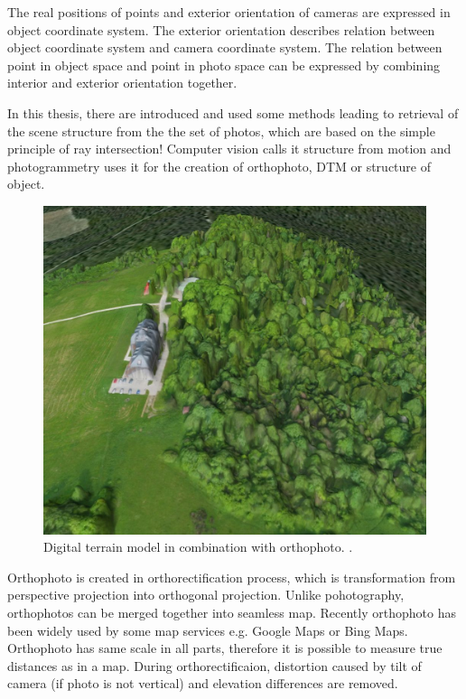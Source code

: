 \documentclass[a4paper,12pt]{article}
\begin{document}
The real positions of points and exterior orientation of cameras are expressed in object coordinate system. 
The exterior orientation describes relation between object coordinate system and camera coordinate system. 
The relation between point in object 
space and point in photo space can be expressed by combining interior and exterior orientation together.

In this thesis, there are introduced and used  some methods leading to retrieval of the scene structure from the 
the set of photos, which are based on the simple principle of ray intersection! Computer vision calls it structure from motion 
and photogrammetry uses it for the creation of orthophoto, DTM or structure of object.


\begin{figure}[h]
    \centering
    \includegraphics[scale=0.3]{figures/dtm.jpg}
    \caption{Digital terrain model in combination with orthophoto. \cite{kbosak2010bezmiechowa}.}
\end{figure}


Orthophoto is created in 
orthorectification process, which is transformation from perspective projection into orthogonal projection.
Unlike pohotography, orthophotos can be merged together into seamless map. Recently 
orthophoto has been widely used by some map services e.g. Google Maps or Bing Maps. Orthophoto 
has same scale in all parts, therefore it is possible to measure true distances as in a map. During orthorectificaion, distortion 
caused by tilt of camera (if photo is not vertical) and elevation differences are removed.
\end{document}
